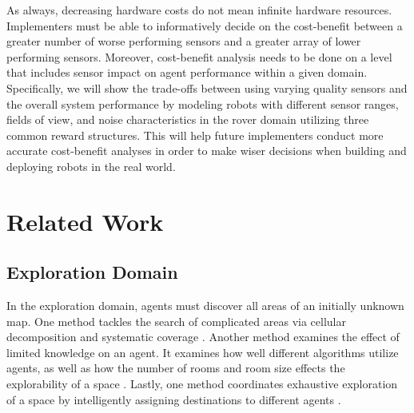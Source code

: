 \documentclass[letterpaper, 10 pt, conference]{ieeeconf}  %
\begin{document}
As always, decreasing hardware costs do not mean infinite hardware resources.
Implementers must be able to informatively decide on the cost-benefit 
between a greater number of worse performing sensors and a greater array of lower performing sensors. Moreover, cost-benefit analysis needs to be done on a level that includes sensor impact on  agent performance within a given domain. Specifically, we will show the trade-offs between using varying quality sensors and the overall system performance by modeling robots with different sensor ranges, fields of view, and noise characteristics in the rover domain utilizing three common reward structures. This will help future implementers conduct more accurate cost-benefit analyses in order to make wiser decisions when building and deploying robots in the real world.


\section{Related Work}
\subsection{Exploration Domain}
In the exploration domain, agents must discover all areas of an
initially unknown map. One method tackles the search of complicated
areas via cellular decomposition and systematic coverage \cite{choset2001coverage}. Another
method examines the effect of limited knowledge on an agent. It
examines how well different algorithms utilize agents, as well as how
the number of rooms and room size effects the explorability of a space
\cite{ferranti2007brick}. Lastly, one method coordinates exhaustive exploration of a space
by intelligently assigning destinations to different agents \cite{burgard2005coordinated}.
\end{document}
